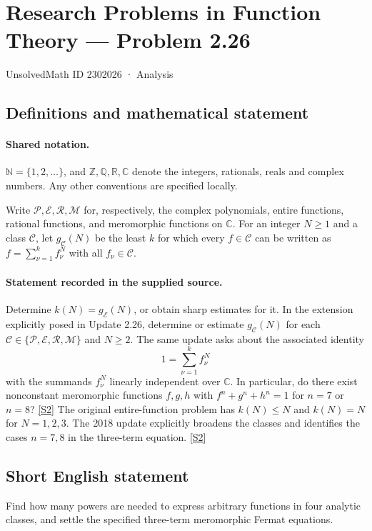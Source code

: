 \documentclass[11pt]{article}
\newcommand{\sref}[2]{\hyperlink{source:#1:#2}{[S#2]}}
\begin{document}
\setcounter{section}{2302025}
\section{Research Problems in Function Theory — Problem 2.26}\label{2302026}
{\small\sffamily UnsolvedMath ID 2302026 · Analysis}
\subsection{Definitions and mathematical statement}

\paragraph{Shared notation.}$\mathbb N=\{1,2,\ldots\}$, and $\mathbb Z,\mathbb Q,\mathbb R,\mathbb C$ denote the integers, rationals, reals and complex numbers. Any other conventions are specified locally.


Write $\mathcal P,\mathcal E,\mathcal R,\mathcal M$ for, respectively, the complex polynomials, entire functions, rational functions, and meromorphic functions on $\mathbb C$. For an integer $N\ge1$ and a class $\mathcal C$, let $g_{\mathcal C}(N)$ be the least $k$ for which every $f\in\mathcal C$ can be written as $f=\sum_{\nu=1}^k f_\nu^N$ with all $f_\nu\in\mathcal C$.

\paragraph{Statement recorded in the supplied source.}
Determine $k(N)=g_{\mathcal E}(N)$, or obtain sharp estimates for it. In the extension explicitly posed in Update 2.26, determine or estimate $g_{\mathcal C}(N)$ for each $\mathcal C\in\{\mathcal P,\mathcal E,\mathcal R,\mathcal M\}$ and $N\ge2$.
The same update asks about the associated identity
\[1=\sum_{\nu=1}^k f_\nu^N\]
with the summands $f_\nu^N$ linearly independent over $\mathbb C$. In particular, do there exist nonconstant meromorphic functions $f,g,h$ with $f^n+g^n+h^n=1$ for $n=7$ or $n=8$? \sref{2302026}{2}
The original entire-function problem has $k(N)\le N$ and $k(N)=N$ for $N=1,2,3$. The 2018 update explicitly broadens the classes and identifies the cases $n=7,8$ in the three-term equation. \sref{2302026}{2}
\subsection{Short English statement}
Find how many powers are needed to express arbitrary functions in four analytic classes, and settle the specified three-term meromorphic Fermat equations.
\end{document}
